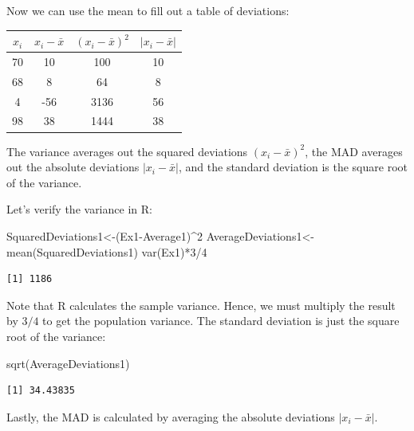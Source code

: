 \documentclass[
  letterpaper,
  DIV=11,
  numbers=noendperiod]{scrreprt}
\newenvironment{Shaded}{\begin{snugshade}}{\end{snugshade}}
\newcommand{\DecValTok}[1]{\textcolor[rgb]{0.68,0.00,0.00}{#1}}
\newcommand{\FunctionTok}[1]{\textcolor[rgb]{0.28,0.35,0.67}{#1}}
\newcommand{\NormalTok}[1]{\textcolor[rgb]{0.00,0.23,0.31}{#1}}
\newcommand{\OtherTok}[1]{\textcolor[rgb]{0.00,0.23,0.31}{#1}}
\newcommand{\SpecialCharTok}[1]{\textcolor[rgb]{0.37,0.37,0.37}{#1}}
\begin{document}
Now we can use the mean to fill out a table of deviations:

\begin{longtable}[]{@{}cccc@{}}
\toprule()
\(x_{i}\) & \(x_{i}-\bar{x}\) & \((x_{i}-\bar{x})^2\) &
\(|x_{i}-\bar{x}|\) \\
\midrule()
\endhead
70 & 10 & 100 & 10 \\
68 & 8 & 64 & 8 \\
4 & -56 & 3136 & 56 \\
98 & 38 & 1444 & 38 \\
\bottomrule()
\end{longtable}

The variance averages out the squared deviations \((x_{i}-\bar{x})^2\),
the MAD averages out the absolute deviations \(|x_{i}-\bar{x}|\), and
the standard deviation is the square root of the variance.

Let's verify the variance in R:

\begin{Shaded}
\begin{Highlighting}[numbers=left,,]
\NormalTok{SquaredDeviations1}\OtherTok{\textless{}{-}}\NormalTok{(Ex1}\SpecialCharTok{{-}}\NormalTok{Average1)}\SpecialCharTok{\^{}}\DecValTok{2}
\NormalTok{AverageDeviations1}\OtherTok{\textless{}{-}}\FunctionTok{mean}\NormalTok{(SquaredDeviations1)}
\FunctionTok{var}\NormalTok{(Ex1)}\SpecialCharTok{*}\DecValTok{3}\SpecialCharTok{/}\DecValTok{4}
\end{Highlighting}
\end{Shaded}

\begin{verbatim}
[1] 1186
\end{verbatim}

Note that R calculates the sample variance. Hence, we must multiply the
result by \(3/4\) to get the population variance. The standard deviation
is just the square root of the variance:

\begin{Shaded}
\begin{Highlighting}[numbers=left,,]
\FunctionTok{sqrt}\NormalTok{(AverageDeviations1)}
\end{Highlighting}
\end{Shaded}

\begin{verbatim}
[1] 34.43835
\end{verbatim}

Lastly, the MAD is calculated by averaging the absolute deviations
\(|x_{i}-\bar{x}|\).
\end{document}
